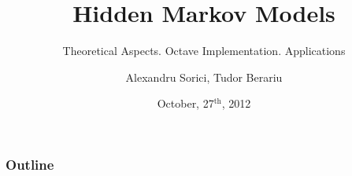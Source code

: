 \documentclass{beamer}
\title[HMM]{Hidden Markov Models}
\subtitle{Theoretical Aspects. Octave Implementation. Applications}
\author[A. Sorici, T. Berariu]{Alexandru Sorici, Tudor Berariu}
\institute[ARIA]{Romanian Asociation for Artificial Intelligence}
\date{October, 27$^{\text{th}}$, 2012}
\begin{document}
\maketitle

\begin{frame}
  \tableofcontents[onlyparts]
\end{frame}

\begin{frame}
  \frametitle{Outline}
  \tableofcontents[pausesections]
\end{frame}







\end{document}
